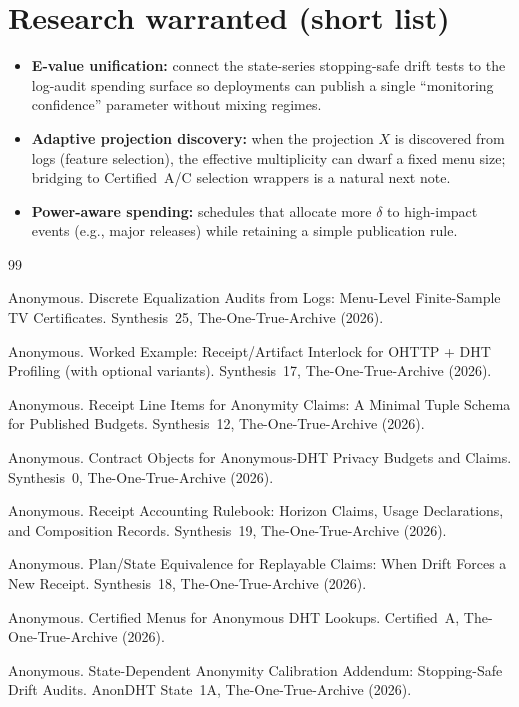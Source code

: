 \documentclass[11pt]{article}
\begin{document}
\section{Research warranted (short list)}
\begin{itemize}[leftmargin=*]
\item \textbf{E-value unification:} connect the state-series stopping-safe drift tests to the log-audit spending surface so deployments can publish a single ``monitoring confidence'' parameter without mixing regimes.
\item \textbf{Adaptive projection discovery:} when the projection $X$ is discovered from logs (feature selection), the effective multiplicity can dwarf a fixed menu size; bridging to Certified~A/C selection wrappers is a natural next note.\cite{series:menus}
\item \textbf{Power-aware spending:} schedules that allocate more $\delta$ to high-impact events (e.g., major releases) while retaining a simple publication rule.
\end{itemize}

\begin{thebibliography}{99}\small

Anonymous.
\newblock Discrete Equalization Audits from Logs: Menu-Level Finite-Sample TV Certificates.
\newblock Synthesis~25, The-One-True-Archive (2026).

Anonymous.
\newblock Worked Example: Receipt/Artifact Interlock for OHTTP + DHT Profiling (with optional variants).
\newblock Synthesis~17, The-One-True-Archive (2026).

Anonymous.
\newblock Receipt Line Items for Anonymity Claims: A Minimal Tuple Schema for Published Budgets.
\newblock Synthesis~12, The-One-True-Archive (2026).

Anonymous.
\newblock Contract Objects for Anonymous-DHT Privacy Budgets and Claims.
\newblock Synthesis~0, The-One-True-Archive (2026).

Anonymous.
\newblock Receipt Accounting Rulebook: Horizon Claims, Usage Declarations, and Composition Records.
\newblock Synthesis~19, The-One-True-Archive (2026).

Anonymous.
\newblock Plan/State Equivalence for Replayable Claims: When Drift Forces a New Receipt.
\newblock Synthesis~18, The-One-True-Archive (2026).

Anonymous.
\newblock Certified Menus for Anonymous DHT Lookups.
\newblock Certified~A, The-One-True-Archive (2026).

Anonymous.
\newblock State-Dependent Anonymity Calibration Addendum: Stopping-Safe Drift Audits.
\newblock AnonDHT State~1A, The-One-True-Archive (2026).

\end{thebibliography}
\end{document}
